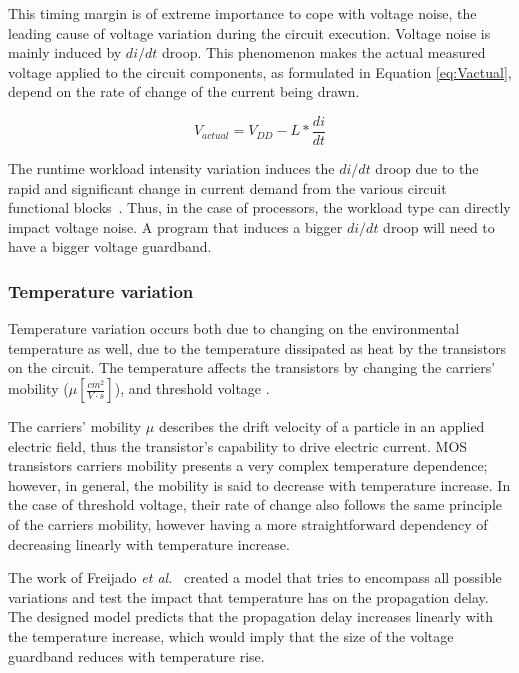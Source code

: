This timing margin is of extreme importance to cope with voltage noise, the leading cause of voltage variation during the circuit execution. Voltage noise is mainly induced by $di/dt$ droop. This phenomenon makes the actual measured voltage applied to the circuit components, as formulated in Equation \ref{eq:Vactual}, depend on the rate of change of the current being drawn. 

\begin{equation}
    \label{eq:Vactual}
    V_{actual} = V_{DD}-L*\frac{di}{dt}
\end{equation}

The runtime workload intensity variation induces the $di/dt$ droop due to the rapid and significant change in current demand from the various circuit functional blocks~\cite{thomas_core_2016}. Thus, in the case of processors, the workload type can directly impact voltage noise. A program that induces a bigger $di/dt$ droop will need to have a bigger voltage guardband.

\subsubsection{Temperature variation}

Temperature variation occurs both due to changing on the environmental temperature as well, due to the temperature dissipated as heat by the transistors on the circuit. The temperature affects the transistors by changing the carriers' mobility ($ \mu [\frac{cm^2}{V\cdot s}]$), and threshold voltage \cite{wolpert_temperature_2012}.

The carriers' mobility $ \mu $ describes the drift velocity of a particle in an applied electric field, thus the transistor's capability to drive electric current. MOS transistors carriers mobility presents a very complex temperature dependence; however, in general, the mobility is said to decrease with temperature increase. In the case of threshold voltage, their rate of change also follows the same principle of the carriers mobility, however having a more straightforward dependency of decreasing linearly with temperature increase.

The work of Freijado \textit{et al.}~\cite{freijedo_modeling_2012} created a model that tries to encompass all possible variations and test the impact that temperature has on the propagation delay. The designed model predicts that the propagation delay increases linearly with the temperature increase, which would imply that the size of the voltage guardband reduces with temperature rise. 

